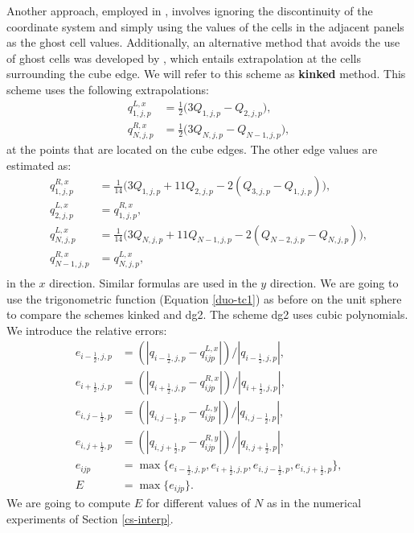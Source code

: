Another approach, employed in \citet{sadourny:1972}, involves ignoring the
discontinuity of the coordinate system and simply using the values of the cells 
in the adjacent panels as the ghost cell values. 
Additionally, an alternative method that avoids the use of ghost cells was developed by
\citet{putman:2007}, which entails extrapolation at the cells surrounding the cube edge.
We will refer to this scheme as \textbf{kinked} method.
This scheme uses the following extrapolations:
\begin{align*}
	q^{L,x}_{1,j,p} &= \frac{1}{2}\bigg(3Q_{1,j,p} - Q_{2,j,p}\bigg),\\
	q^{R,x}_{N,j,p} &= \frac{1}{2}\bigg(3Q_{N,j,p} - Q_{N-1,j,p}\bigg),
\end{align*}
at the points that are located on the cube edges. The other edge values are estimated as:
\begin{align*}
	q^{R,x}_{1,j,p} &= \frac{1}{14}\bigg(3Q_{1,j,p} + 11Q_{2,j,p} - 2(Q_{3,j,p} - Q_{1,j,p})\bigg),\\
	q^{L,x}_{2,j,p} &= q^{R,x}_{1,j,p},\\
	q^{L,x}_{N,j,p} &= \frac{1}{14}\bigg(3Q_{N,j,p} + 11Q_{N-1,j,p} - 2(Q_{N-2,j,p} - Q_{N,j,p})\bigg),\\
	q^{R,x}_{N-1,j,p} &= q^{L,x}_{N,j,p},\\
\end{align*}
in the $x$ direction. Similar formulas are used in the $y$ direction.
We are going to use the trigonometric function (Equation \eqref{duo-tc1})
as before on the unit sphere to compare the schemes kinked and dg2. The scheme dg2 uses cubic polynomials.
We introduce the relative errors:
\begin{align*}
	e_{{i-\frac{1}{2}},j,p} &= (|q_{{i-\frac{1}{2}},j,p} - q^{L,x}_{ijp}|)/|q_{{i-\frac{1}{2}},j,p}|,\\
	e_{{i+\frac{1}{2}},j,p} &= (|q_{{i+\frac{1}{2}},j,p} - q^{R,x}_{ijp}|)/|q_{{i+\frac{1}{2}},j,p}|,\\
	e_{i,{j-\frac{1}{2}},p} &= (|q_{i,{j-\frac{1}{2}},p} - q^{L,y}_{ijp}|)/|q_{i,{j-\frac{1}{2}},p}|,\\
	e_{i,{j+\frac{1}{2}},p} &= (|q_{i,{j+\frac{1}{2}},p} - q^{R,y}_{ijp}|)/|q_{i,{j+\frac{1}{2}},p}|,\\
	e_{ijp} &= \max\{e_{{i-\frac{1}{2}},j,p}, e_{{i+\frac{1}{2}},j,p} , e_{i,{j-\frac{1}{2}},p}, e_{i,{j+\frac{1}{2}},p} \},\\
	E &= \max \{e_{ijp}\}.
\end{align*}
We are going to compute $E$ for different values of $N$ as in the numerical experiments of Section \ref{cs-interp}.
